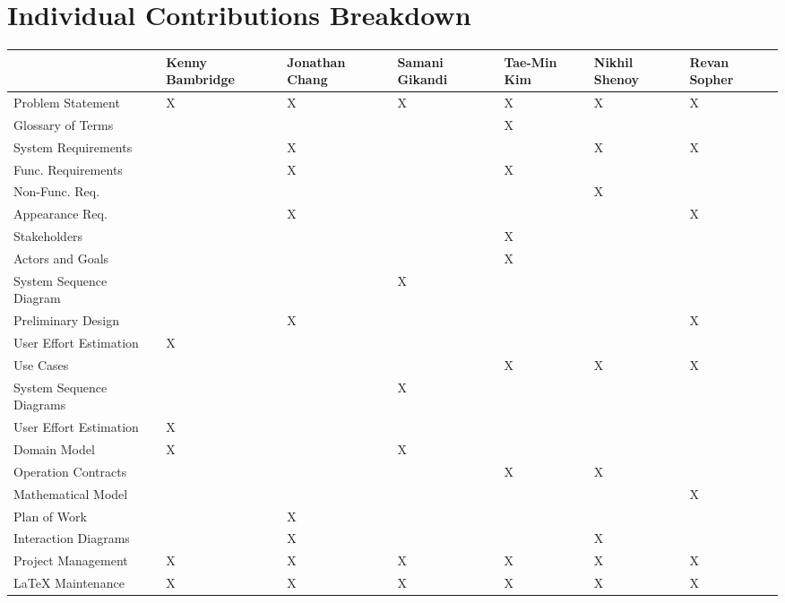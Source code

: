 \documentclass[letterpaper,english, 12pt]{scrreprt}
\begin{document}
\chapter*{Individual Contributions Breakdown}
\begin{center}
	\begin{tabular}{|l|C{2cm}|C{1.5cm}|C{1.5cm}|C{1.5cm}|C{1.5cm}|C{1.5cm}|}
		\hline
			&	Kenny Bambridge		&	Jonathan Chang		&	Samani Gikandi		&	Tae-Min Kim	&	  Nikhil Shenoy		&	Revan Sopher\\ \hline
Problem Statement	&		X		&		X		&		X		&		X	&		X		&	X	    \\ \hline
Glossary of Terms	&				&				&				&		X	&				&      		\\ \hline
System Requirements	&				&		X		&				&			&		X		&	X	\\ \hline
Func. Requirements	&				&		X		&				&		X	&				&		\\ \hline
Non-Func. Req.		&				&				&				&			&		X		&		\\ \hline
Appearance Req.		&				&		X		&				&			&				&		X\\ \hline
Stakeholders		&				&				&				&		X	&				&		 \\ \hline
Actors and Goals	&				&				&				&		X	&				&		 \\ \hline
System Sequence Diagram &				&				&		X		&			&				&		 \\ \hline
Preliminary Design	&				&		X		&				&			&				&	X	 \\ \hline
User Effort Estimation  &		X		&				&				&			&				&		 \\ \hline
Use Cases		&				&				&				&		X	&		X		&	X	 \\ \hline
System Sequence Diagrams&		  		&				&		X		&			&				&		 \\ \hline
User Effort Estimation	&		X		&				&				&			&				&		 \\ \hline
Domain Model		&		X		&				&		X		&			&				&		 \\ \hline
Operation Contracts	&				&				&				&		X	&		X		&		 \\ \hline
Mathematical Model	&				&				&				&			&				&	X	 \\ \hline
Plan of Work		&				&		X		&				&			&				&		 \\ \hline
Interaction Diagrams	&				&		X		&				&			&		X		&		 \\ \hline
Project Management	&		X		&		X		&		X		&		X	&		X		&		X\\ \hline
LaTeX Maintenance	&		X		&		X		&		X		&		X	&		X		&		X\\ \hline
	\end{tabular}
\end{center}
\end{document}

